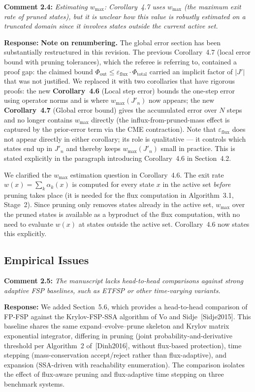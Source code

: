 \documentclass[11pt]{article}
\begin{document}
\medskip

\noindent\textbf{Comment 2.4:} \textit{Estimating $w_{\max}$: Corollary~4.7
uses $w_{\max}$ (the maximum exit rate of pruned states), but it is unclear how
this value is robustly estimated on a truncated domain since it involves states
outside the current active set.}

\textbf{Response:} \textbf{Note on renumbering.}  The global error section has been substantially restructured in this revision.  The previous Corollary~4.7 (local error bound with pruning tolerances), which the referee is referring to, contained a proof gap: the claimed bound $\Phi_{\mathrm{out}} \leq \varepsilon_{\mathrm{flux}}\cdot\Phi_{\mathrm{total}}$ carried an implicit factor of $|J'|$ that was not justified.  We replaced it with two corollaries that have rigorous proofs: the new \textbf{Corollary~4.6} (Local step error) bounds the one-step error using operator norms and is where $w_{\max}(J'_n)$ now appears; the new \textbf{Corollary~4.7} (Global error bound) gives the accumulated error over $N$ steps and no longer contains $w_{\max}$ directly (the influx-from-pruned-mass effect is captured by the prior-error term via the CME contraction).  Note that $\varepsilon_{\mathrm{flux}}$ does not appear directly in either corollary; its role is qualitative — it controls which states end up in $J'_n$ and thereby keeps $w_{\max}(J'_n)$ small in practice. This is stated explicitly in the paragraph introducing Corollary~4.6 in Section~4.2.

We clarified the $w_{\max}$ estimation question in Corollary~4.6.  The exit rate $w(x) = \sum_k \alpha_k(x)$ is computed for every state $x$ in the active set \emph{before} pruning takes place (it is needed for the flux computation in Algorithm~3.1, Stage~2).  Since pruning only removes states already in the active set, $w_{\max}$ over the pruned states is available as a byproduct of the flux computation, with no need to evaluate $w(x)$ at states outside the active set.  Corollary~4.6 now states this explicitly.

\subsection*{Empirical Issues}

\noindent\textbf{Comment 2.5:} \textit{The manuscript lacks head-to-head
comparisons against strong adaptive FSP baselines, such as ETFSP or other
time-varying variants.}

\textbf{Response:} We added Section~5.6, which provides a head-to-head
comparison of FP-FSP against the Krylov-FSP-SSA algorithm of Vo and
Sidje~[Sidje2015]. This baseline shares
the same expand--evolve--prune skeleton and Krylov matrix exponential
integrator, differing in pruning (joint probability-and-derivative threshold per
Algorithm~2 of~[Dinh2016], without flux-based protection), time stepping
(mass-conservation accept/reject rather than flux-adaptive), and expansion
(SSA-driven with reachability enumeration). The comparison isolates the effect
of flux-aware pruning and flux-adaptive time stepping on three benchmark systems.
\end{document}
